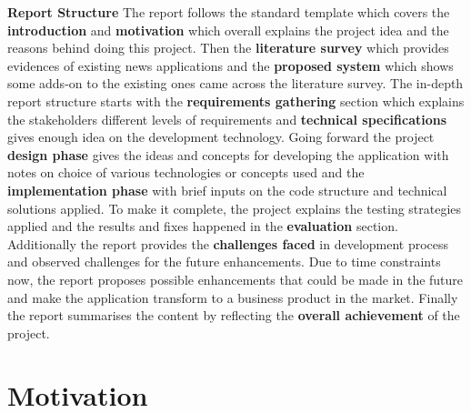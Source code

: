 {\bf  \large  Report Structure}  \newline 
The report follows the standard template which covers the \textbf{introduction} and \textbf{motivation} which overall explains the project idea and the reasons behind doing this project. Then the \textbf{literature survey} which provides evidences of existing news applications and the \textbf{proposed system} which shows some adds-on to the existing ones came across the literature survey. \newline
The in-depth report structure starts with the \textbf{requirements gathering} section which explains the stakeholders different levels of requirements and \textbf{technical specifications} gives enough idea on the development technology.\newline
Going forward the project \textbf{design phase} gives the ideas and concepts for developing the application with notes on choice of various technologies or concepts used and the \textbf{implementation phase} with brief inputs on the code structure and technical solutions applied. 
To make it complete, the project explains the testing strategies applied and the results and fixes happened in the \textbf{evaluation} section. Additionally the report provides the \textbf{challenges faced} in development process and observed challenges for the future enhancements. Due to time constraints now, the report proposes possible enhancements that could be made in the future and make the application transform to a business product in the market. Finally the report summarises the content by reflecting the \textbf{overall achievement} of the project.

 

\section{Motivation}


